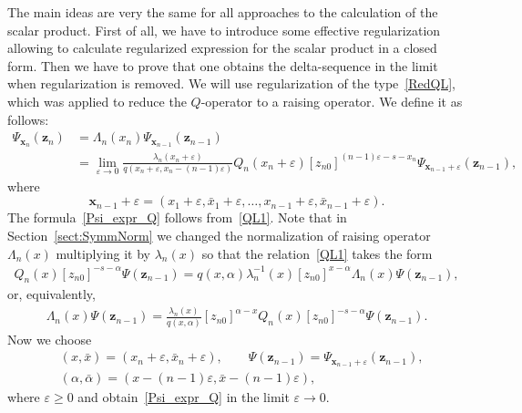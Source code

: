 \documentclass[10pt,a4paper]{amsart}
\numberwithin{equation}{section}
\begin{document}
The main ideas are very the same for all approaches to the calculation of the scalar product. First of all, we have to introduce some effective regularization allowing to calculate regularized expression for the scalar product in a closed form. Then we have to prove that one obtains the delta-sequence in the limit when regularization is removed.
We will use regularization of the type~\eqref{RedQL}, which was applied to reduce the $Q$-operator to a raising operator. We define it as follows:
\begin{align}
\nonumber
	\Psi_{\bm{x}_n}(\bm{z}_n) &= \Lambda_n(x_n) \Psi_{\bm{x}_{n-1}}(\bm{z}_{n-1}) \\
	&\label{Psi_expr_Q}
	=\lim\limits_{\varepsilon\to 0}
	\frac{\lambda_n(x_n+\varepsilon)}{q(x_n+\varepsilon, x_n-(n-1)\varepsilon)}
	Q_n(x_n+\varepsilon) [z_{n0}]^{(n-1)\varepsilon-s-x_n} \Psi_{\bm{x}_{n-1}+\varepsilon}(\bm{z}_{n-1}) ,
\end{align}
where
\begin{equation*}
\bm{x}_{n-1}+\varepsilon=(x_1+\varepsilon, \bar{x}_1+\varepsilon, \dots, x_{n-1}+\varepsilon, \bar{x}_{n-1}+\varepsilon) .
\end{equation*}
The formula~\eqref{Psi_expr_Q} follows from~\eqref{QL1}. Note that in Section~\ref{sect:SymmNorm} we changed the normalization of raising operator $\Lambda_n(x)$ multiplying it by $\lambda_n(x)$ so that the relation~\eqref{QL1} takes the form
\begin{align*}
	Q_n(x) [z_{n 0}]^{-s-\alpha} \Psi(\bm z_{n-1}) =
	q(x,\alpha) \lambda_n^{-1}(x) [z_{n0}]^{x-\alpha}
	\Lambda_n( x) \Psi(\bm z_{n-1}) ,
\end{align*}
or, equivalently,
\begin{align*}
	\Lambda_n(x) \Psi(\bm z_{n-1}) = \frac{\lambda_n(x)}{q(x,\alpha)}
	[z_{n0}]^{\alpha-x} Q_n(x) [z_{n 0}]^{-s-\alpha} \Psi(\bm z_{n-1}) .
\end{align*}
Now we choose
\begin{align*}
&(x,\bar{x})=(x_n+\varepsilon,\bar{x}_n+\varepsilon) ,\qquad \Psi(\bm z_{n-1})=\Psi_{\bm{x}_{n-1}+\varepsilon}(\bm{z}_{n-1}) , \\
&(\alpha,\bar{\alpha})=(x-(n-1)\varepsilon, \bar{x}-(n-1)\varepsilon) ,
\end{align*}
where $\varepsilon \geq 0$ and obtain~\eqref{Psi_expr_Q} in the limit $\varepsilon\to 0$.
\end{document}
